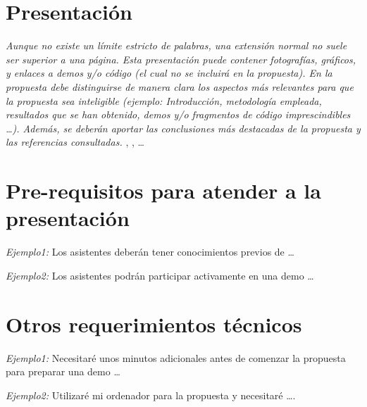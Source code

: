 \documentclass[runningheads]{llncs}
\begin{document}
\section{Presentaci\'on}

\textit{Aunque no existe un l\'imite estricto de palabras, una extensi\'on normal no suele ser superior a una p\'agina. Esta presentaci\'on puede contener fotograf\'ias, gr\'aficos, y enlaces a demos y/o c\'odigo (el cual no se incluir\'a en la propuesta). En la propuesta debe distinguirse de manera clara los aspectos m\'as relevantes para que la propuesta sea inteligible (ejemplo: Introducci\'on, metodolog\'ia empleada, resultados que se han obtenido, demos y/o fragmentos de c\'odigo imprescindibles \dots). Adem\'as, se deber\'an aportar las conclusiones m\'as destacadas de la propuesta y las referencias consultadas.}
\cite{Alpher02},
\cite{Alpher03}, \cite{Alpher04} \dots


\section{Pre-requisitos para atender a la presentación}
\textit{Ejemplo1:} Los asistentes deber\'an tener conocimientos previos de \dots 

\textit{Ejemplo2:} Los asistentes podr\'an participar activamente en una demo \dots

\section{Otros requerimientos t\'ecnicos}

\textit{Ejemplo1:} Necesitar\'e unos minutos adicionales antes de comenzar la propuesta para preparar una demo \dots 

\textit{Ejemplo2:} Utilizar\'e mi ordenador para la propuesta y necesitar\'e \dots. 


\clearpage



\end{document}
